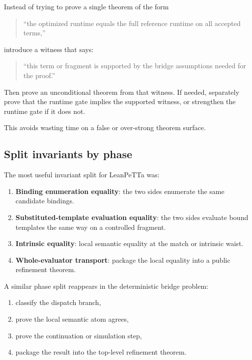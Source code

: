 \documentclass[11pt]{article}
\begin{document}
Instead of trying to prove a single theorem of the form

\begin{quote}
``the optimized runtime equals the full reference runtime on all accepted terms,''
\end{quote}

introduce a witness that says:

\begin{quote}
``this term or fragment is supported by the bridge assumptions needed for the proof.''
\end{quote}

Then prove an unconditional theorem from that witness. If needed, separately prove that the runtime gate implies the supported witness, or strengthen the runtime gate if it does not.

This avoids wasting time on a false or over-strong theorem surface.

\subsection{Split invariants by phase}

The most useful invariant split for LeanPeTTa was:

\begin{enumerate}
  \item \textbf{Binding enumeration equality}: the two sides enumerate the same candidate bindings.
  \item \textbf{Substituted-template evaluation equality}: the two sides evaluate bound templates the same way on a controlled fragment.
  \item \textbf{Intrinsic equality}: local semantic equality at the match or intrinsic waist.
  \item \textbf{Whole-evaluator transport}: package the local equality into a public refinement theorem.
\end{enumerate}

A similar phase split reappears in the deterministic bridge problem:

\begin{enumerate}
  \item classify the dispatch branch,
  \item prove the local semantic atom agrees,
  \item prove the continuation or simulation step,
  \item package the result into the top-level refinement theorem.
\end{enumerate}
\end{document}
